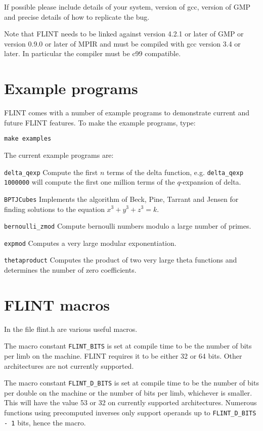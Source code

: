 \documentclass[a4paper,10pt]{article}
\newcommand{\code}{\lstinline}
\begin{document}
If possible please include details of your system, version of gcc, version of GMP and precise details of how to replicate the bug.

Note that FLINT needs to be linked against version 4.2.1 or later of GMP or version 0.9.0 or later of MPIR and must be compiled with gcc version 3.4 or later. In particular the compiler must be c99 compatible.

\section{Example programs}

FLINT comes with a number of example programs to demonstrate current and future FLINT features. To make the example programs, type:

\code{make examples}

The current example programs are:

\code{delta_qexp} Compute the first $n$ terms of the delta function, e.g. \code{delta_qexp 1000000} will compute the first one million terms of the $q$-expansion of delta.

\code{BPTJCubes} Implements the algorithm of Beck, Pine, Tarrant and Jensen for finding solutions to the equation $x^3+y^3+z^3 = k$.

\code{bernoulli_zmod} Compute bernoulli numbers modulo a large number of primes.

\code{expmod} Computes a very large modular exponentiation.

\code{thetaproduct} Computes the product of two very large theta functions and determines the number of zero coefficients.

\section{FLINT macros}
In the file flint.h are various useful macros.

The macro constant \code{FLINT_BITS} is set at compile time to be the number of bits per limb on the machine. FLINT requires it to be either 32 or 64 bits. Other architectures are not currently supported.

The macro constant \code{FLINT_D_BITS} is set at compile time to be the number of bits per double on the machine or the number of bits per limb, whichever is smaller. This will have the value 53 or 32 on currently supported architectures. Numerous functions using precomputed inverses only support operands up to \code{FLINT_D_BITS - 1} bits, hence the macro.
\end{document}

